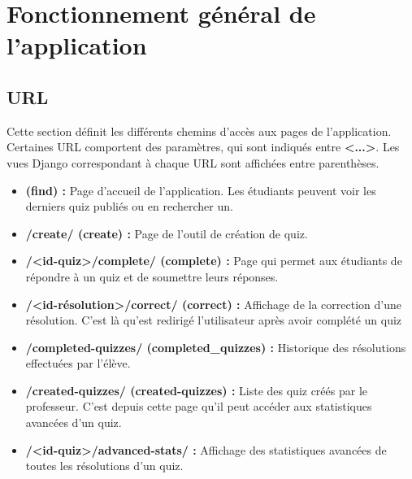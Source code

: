 \documentclass[a4,10pt,french]{sphinxmanual}
\begin{document}
\chapter{Fonctionnement général de l'application}
\label{global::doc}\label{global:fonctionnement-general-de-l-application}

\section{URL}
\label{global:url}
Cette section définit les différents chemins d'accès aux pages de l'application. Certaines URL comportent des paramètres,
qui sont indiqués entre \textbf{\textless{}...\textgreater{}}. Les vues Django correspondant à chaque URL sont affichées entre parenthèses.
\begin{itemize}
\item {} 
\textbf{(find) :} Page d'accueil de l'application. Les étudiants peuvent voir les derniers quiz publiés ou en rechercher un.

\item {} 
\textbf{/create/ (create) :} Page de l'outil de création de quiz.

\item {} 
\textbf{/\textless{}id-quiz\textgreater{}/complete/ (complete) :} Page qui permet aux étudiants de répondre à un quiz et de soumettre leurs réponses.

\item {} 
\textbf{/\textless{}id-résolution\textgreater{}/correct/ (correct) :} Affichage de la correction d'une résolution. C'est là qu'est redirigé l'utilisateur après avoir complété un quiz

\item {} 
\textbf{/completed-quizzes/ (completed\_quizzes) :} Historique des résolutions effectuées par l'élève.

\item {} 
\textbf{/created-quizzes/ (created-quizzes) :} Liste des quiz créés par le professeur. C'est depuis cette page qu'il peut accéder aux statistiques avancées d'un quiz.

\item {} 
\textbf{/\textless{}id-quiz\textgreater{}/advanced-stats/ :} Affichage des statistiques avancées de toutes les résolutions d'un quiz.

\end{itemize}
\end{document}

